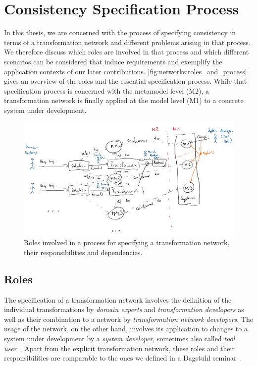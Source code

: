 \section{Consistency Specification Process}
\label{chap:networks:specification_process}

In this thesis, we are concerned with the process of specifying consistency in terms of a transformation network and different problems arising in that process.
We therefore discuss which roles are involved in that process and which different scenarios can be considered that induce requirements and exemplify the application contexts of our later contributions.
\autoref{fig:networks:roles_and_process} gives an overview of the roles and the essential specification process.
While that specification process is concerned with the metamodel level (M2), a transformation network is finally applied at the model level (M1) to a concrete system under development.

\begin{figure}
    \centering
    \includegraphics[width=\textwidth]{figures/prologue/networks/roles_and_process}
    \caption[Roles in a transformation network specification process]{Roles involved in a process for specifying a transformation network, their responsibilities and dependencies.}
    \label{fig:networks:roles_and_process}
\end{figure}


\subsection{Roles}

The specification of a transformation network involves the definition of the individual transformations by \emph{domain experts} and \emph{transformation developers} as well as their combination to a network by \emph{transformation network developers}.
The usage of the network, on the other hand, involves its application to changes to a system under development by a \emph{system developer}, sometimes also called \emph{tool user}~\cite{klare2019dagstuhl}.
Apart from the explicit transformation network, these roles and their responsibilities are comparable to the ones we defined in a Dagstuhl seminar~\cite{klare2019dagstuhl}.

